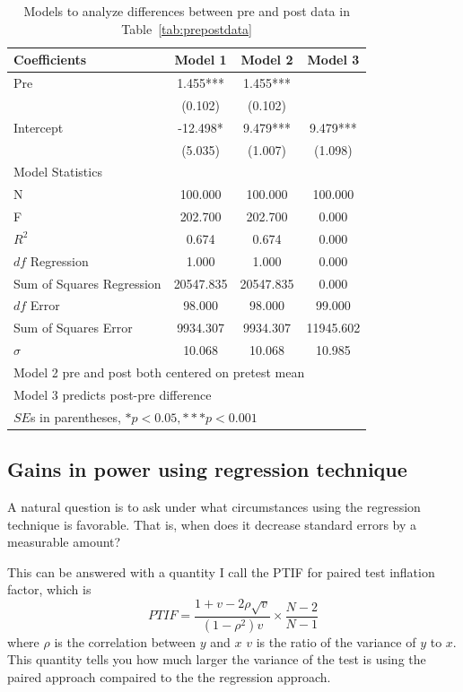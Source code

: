 \begin{table}[htbp]\centering
 \caption{Models to analyze differences between pre and post data in Table~\ref{tab:prepostdata}
\label{tab:prepostreg}}
\begin{tabular}{lccc}
\hline
Coefficients & Model 1 & Model 2 & Model 3 \\
\hline
Pre      &    1.455***&    1.455***&        \\
      &   (0.102)  &   (0.102)  &        \\
Intercept    &   -12.498* &    9.479***&    9.479***\\
      &   (5.035)  &   (1.007)  &   (1.098)  \\
\hline
\multicolumn{4}{l}{Model Statistics} \\
\hline
N      &   100.000  &   100.000  &   100.000  \\
F      &   202.700  &   202.700  &    0.000  \\
$R^2$     &    0.674  &    0.674  &    0.000  \\
$df$ Regression    &    1.000  &    1.000  &    0.000  \\
Sum of Squares Regression    &  20547.835  &  20547.835  &    0.000  \\
$df$ Error    &   98.000  &   98.000  &   99.000  \\
Sum of Squares Error     &  9934.307  &  9934.307  &  11945.602  \\
$\sigma$    &   10.068  &   10.068  &   10.985  \\
\hline
\multicolumn{4}{l}{Model 2 pre and post both centered on pretest mean} \\
\multicolumn{4}{l}{Model 3 predicts post-pre difference} \\
\multicolumn{4}{l}{$SE$s in parentheses, $*p<0.05, ***p<0.001$} \\
\hline
\end{tabular}
\end{table}

\subsection{Gains in power using regression technique}

A natural question is to ask under what circumstances using the regression technique is favorable. That is, when does it decrease standard errors by a measurable amount?

This can be answered with a quantity I call the PTIF for paired test inflation factor, which is
\begin{equation}
PTIF=\frac{1+v-2\rho\sqrt{v}}{\left(1-\rho^2\right)v}\times\frac{N-2}{N-1}
\end{equation}
where $\rho$ is the correlation between $y$ and $x$ $v$ is the ratio of the variance of $y$ to $x$. This quantity tells you how much larger the variance of the test is using the paired approach compaired to the the regression approach.


